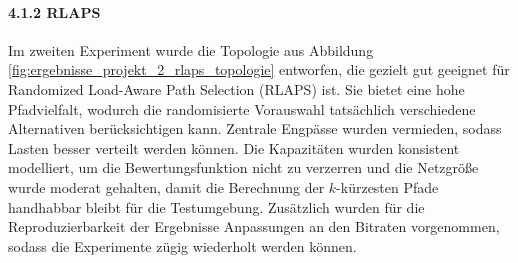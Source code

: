 \documentclass[sigconf,nonacm,review,language=english,language=german]{acmart}
\begin{document}
        \paragraph{4.1.2   RLAPS}
            Im zweiten Experiment wurde die Topologie aus Abbildung \ref{fig:ergebnisse_projekt_2_rlaps_topologie} entworfen, die gezielt gut geeignet für Randomized Load-Aware Path Selection (RLAPS) ist. Sie bietet eine hohe Pfadvielfalt, wodurch die randomisierte Vorauswahl tatsächlich verschiedene Alternativen berücksichtigen kann. Zentrale Engpässe wurden vermieden, sodass Lasten besser verteilt werden können. Die Kapazitäten wurden konsistent modelliert, um die Bewertungsfunktion nicht zu verzerren und die Netzgröße wurde moderat gehalten, damit die Berechnung der $k$-kürzesten Pfade handhabbar bleibt für die Testumgebung. Zusätzlich wurden für die Reproduzierbarkeit der Ergebnisse Anpassungen an den Bitraten vorgenommen, sodass die Experimente zügig wiederholt werden können.
\end{document}
